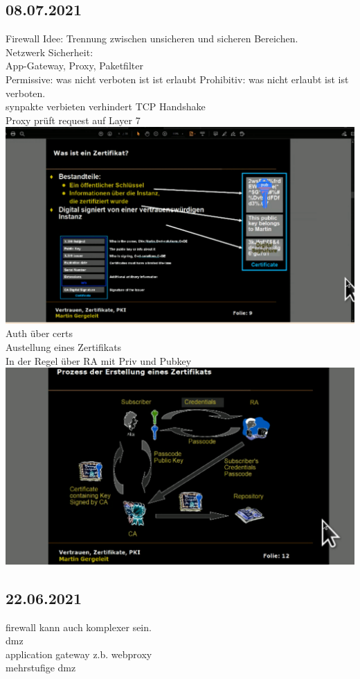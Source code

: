 \documentclass{article}
\begin{document}
	\subsection*{08.07.2021}
	Firewall Idee: Trennung zwischen unsicheren und sicheren Bereichen. \\
	Netzwerk Sicherheit: \\
	App-Gateway, Proxy, Paketfilter \\
	Permissive: was nicht verboten ist ist erlaubt
	Prohibitiv: was nicht erlaubt ist ist verboten. \\
	synpakte verbieten verhindert TCP Handshake \\
	Proxy prüft request auf Layer 7 \\
	\includegraphics[width=\linewidth]{cert} \\
	Auth über certs \\
	Austellung eines Zertifikats \\
	In der Regel über RA mit Priv und Pubkey \\
	\includegraphics[width=\linewidth]{cert2} \\
	\subsection*{22.06.2021}
	firewall kann auch komplexer sein. \\
	dmz \\
	application gateway z.b. webproxy \\
	mehrstufige dmz \\
\end{document}

